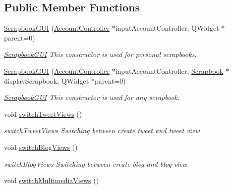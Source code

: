\subsection*{Public Member Functions}
\begin{DoxyCompactItemize}
\item 
\hyperlink{classScrapbookGUI_a121e6cd53f1322ac9c7b2acb294680f0}{Scrapbook\+G\+UI} (\hyperlink{classAccountController}{Account\+Controller} $\ast$input\+Account\+Controller, Q\+Widget $\ast$parent=0)
\begin{DoxyCompactList}\small\item\em \hyperlink{classScrapbookGUI}{Scrapbook\+G\+UI} This constructor is used for personal scrapbooks. \end{DoxyCompactList}\item 
\hyperlink{classScrapbookGUI_a684928568666455bf909bf80a88fb38c}{Scrapbook\+G\+UI} (\hyperlink{classAccountController}{Account\+Controller} $\ast$input\+Account\+Controller, \hyperlink{classScrapbook}{Scrapbook} $\ast$display\+Scrapbook, Q\+Widget $\ast$parent=0)
\begin{DoxyCompactList}\small\item\em \hyperlink{classScrapbookGUI}{Scrapbook\+G\+UI} This constructor is used for any scrapbook. \end{DoxyCompactList}\item 
void \hyperlink{classScrapbookGUI_a8380ec41f3806098f35268a6b933a715}{switch\+Tweet\+Views} ()\hypertarget{classScrapbookGUI_a8380ec41f3806098f35268a6b933a715}{}\label{classScrapbookGUI_a8380ec41f3806098f35268a6b933a715}

\begin{DoxyCompactList}\small\item\em switch\+Tweet\+Views Switching between create tweet and tweet view \end{DoxyCompactList}\item 
void \hyperlink{classScrapbookGUI_afa0ed7d9a879170a899f0dc36c3857f9}{switch\+Blog\+Views} ()\hypertarget{classScrapbookGUI_afa0ed7d9a879170a899f0dc36c3857f9}{}\label{classScrapbookGUI_afa0ed7d9a879170a899f0dc36c3857f9}

\begin{DoxyCompactList}\small\item\em switch\+Blog\+Views Switching between create blog and blog view \end{DoxyCompactList}\item 
void \hyperlink{classScrapbookGUI_a0e27d6cd17b7cfd2b5d8606e14113fb4}{switch\+Multimedia\+Views} ()\hypertarget{classScrapbookGUI_a0e27d6cd17b7cfd2b5d8606e14113fb4}{}\label{classScrapbookGUI_a0e27d6cd17b7cfd2b5d8606e14113fb4}


\end{DoxyCompactItemize}
